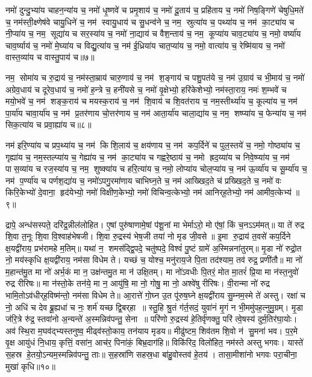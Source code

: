 नमो॑ दुन्दु॒भ्या॑य चाहन॒न्या॑य च॒ नमो॑ धृ॒ष्णवे॑ च प्रमृ॒शाय॑ च॒ नमो॑ दू॒ताय॑ च॒ प्रहि॑ताय च॒ नमो॑ निष॒ङ्गिणे॑ चेषुधि॒मते॑ च॒ नम॑स्ती॒क्ष्णेष॑वे चायु॒धिने॑ च॒ नम॑ स्वायु॒धाय॑ च सु॒धन्व॑ने च॒ नम॒ स्रुत्या॑य च॒ पथ्या॑य च॒ नम॑ का॒ट्या॑य च नी॒प्या॑य च॒ नम॒ सूद्या॑य च सर॒स्या॑य च॒ नमो॑ ना॒द्याय॑ च वैश॒न्ताय॑ च॒ नम॒ कूप्या॑य चाव॒ट्या॑य च॒ नमो॒ वर्ष्या॑य चाव॒र्ष्याय॑ च॒ नमो॑ मे॒घ्या॑य च विद्यु॒त्या॑य च॒ नम॑ ई॒ध्रिया॑य चात॒प्या॑य च॒ नमो॒ वात्या॑य च॒ रेष्मि॑याय च॒ नमो॑ वास्त॒व्या॑य च वास्तु॒पाय॑ च॥७॥ 

नम॒ सोमा॑य च रु॒द्राय॑ च॒ नम॑स्ता॒म्राय॑ चारु॒णाय॑ च॒ नम॑ श॒ङ्गाय॑ च पशु॒पत॑ये च॒ नम॑ उ॒ग्राय॑ च भी॒माय॑ च॒ नमो॑ अग्रेव॒धाय॑ च दूरेव॒धाय॑ च॒ नमो॑ ह॒न्त्रे च॒ हनी॑यसे च॒ नमो॑ वृ॒क्षेभ्यो॒ हरि॑केशेभ्यो॒ नम॑स्ता॒राय॒ नमः॑  श॒म्भवे॑ च मयो॒भवे॑ च॒ नम॑ शङ्क॒राय॑ च मयस्क॒राय॑ च॒ नम॑ शि॒वाय॑ च शि॒वत॑राय च॒ नम॒स्तीर्थ्या॑य च॒ कूल्या॑य च॒ नम॑ पा॒र्या॑य चावा॒र्या॑य च॒ नम॑ प्र॒तर॑णाय चो॒त्तर॑णाय च॒ नम॑ आता॒र्या॑य चाला॒द्या॑य च॒ नम॒ शष्प्या॑य च॒ फेन्या॑य च॒ नम॑ सिक॒त्या॑य च प्रवा॒ह्या॑य च॥८॥ 

नम॑ इरि॒ण्या॑य च प्रप॒थ्या॑य च॒ नम॑ किशि॒लाय॑ च॒ क्षय॑णाय च॒ नम॑ कप॒र्दिने॑ च पुल॒स्तये॑ च॒ नमो॒ गोष्ठ्या॑य च॒ गृह्या॑य च॒ नम॒स्तल्प्या॑य च॒ गेह्या॑य च॒ नम॑ का॒ट्या॑य च गह्वरे॒ष्ठाय॑ च॒ नमो ह्रद॒य्या॑य च निवे॒ष्प्या॑य च॒ नम॑ पास॒व्या॑य च रज॒स्या॑य च॒ नम॒ शुष्क्या॑य च हरि॒त्या॑य च॒ नमो॒ लोप्या॑य चोल॒प्या॑य च॒ नम॑ ऊ॒र्व्या॑य च सू॒र्म्या॑य च॒ नम॑ प॒र्ण्या॑य च पर्णश॒द्या॑य च॒ नमो॑ऽपगु॒रमा॑णाय चाभिघ्न॒ते च॒ नम॑ आख्खिद॒ते च॑ प्रख्खिद॒ते च॒ नमो॑ वः किरि॒केभ्यो॑ दे॒वाना॒ हृद॑येभ्यो॒ नमो॑ विक्षीण॒केभ्यो॒ नमो॑ विचिन्व॒त्केभ्यो॒ नम॑ आनिर्‌ह॒तेभ्यो॒ नम॑ आमीव॒त्केभ्य॑॥९॥ 

द्रापे॒ अन्ध॑सस्पते॒ दरि॑द्र॒न्नील॑लोहित। ए॒षां पुरु॑षाणामे॒षां प॑शू॒नां मा भेर्माऽरो॒ मो ए॑षां॒ किं च॒नऽऽम॑मत्॥ या ते॑ रुद्र शि॒वा त॒नूः शि॒वा वि॒श्वाह॑भेषजी। शि॒वा रु॒द्रस्य॑ भेष॒जी तया॑ नो मृड जी॒वसे॥ इ॒मा रु॒द्राय॑ त॒वसे॑ कप॒र्दिने क्ष॒यद्वी॑राय॒ प्रभ॑रामहे म॒तिम्॥ यथा॑ न॒ शमस॑द्द्वि॒पदे॒ चतु॑ष्पदे॒ विश्वं॑ पु॒ष्टं ग्रामे॑ अ॒स्मिन्नना॑तुरम्॥ मृ॒डा नो॑ रुद्रो॒त नो॒ मय॑स्कृधि क्ष॒यद्वी॑राय॒ नम॑सा विधेम ते। यच्छं च॒ योश्च॒ मनु॑राय॒जे पि॒ता तद॑श्याम॒ तव॑ रुद्र॒ प्रणी॑तौ॥ मा नो॑ म॒हान्त॑मु॒त मा नो॑ अर्भ॒कं मा न॒ उक्ष॑न्तमु॒त मा न॑ उक्षि॒तम्। मा नो॑ऽवधीः पि॒तरं॒ मोत मा॒तरं॑ प्रि॒या मा न॑स्त॒नुवो॑ रुद्र रीरिषः॥ मा न॑स्तो॒के तन॑ये॒ मा न॒ आयु॑षि॒ मा नो॒ गोषु॒ मा नो॒ अश्वे॑षु रीरिषः। वी॒रान्मा नो॑ रुद्र भामि॒तोऽव॑धीर्‌ह॒विष्म॑न्तो॒ नम॑सा विधेम ते॥ आ॒रात्ते॑ गो॒घ्न उ॒त पू॑रुष॒घ्ने क्ष॒यद्वी॑राय सु॒म्नम॒स्मे ते॑ अस्तु। रक्षा॑ च नो॒ अधि॑ च देव ब्रू॒ह्यधा॑ च नः॒ शर्म॑ यच्छ द्वि॒बर्‌हा॥ स्तु॒हि श्रु॒तं ग॑र्त॒सदं॒ युवा॑नं मृ॒गं न भी॒ममु॑पह॒त्नुमु॒ग्रम्। मृ॒डा ज॑रि॒त्रे रु॑द्र॒ स्तवा॑नो अ॒न्यन्ते॑ अ॒स्मन्निव॑पन्तु॒ सेना॥ परि॑णो रु॒द्रस्य॑ हे॒तिर्वृ॑णक्तु॒ परि॑ त्वे॒षस्य॑ दुर्म॒तिर॑घा॒योः। अव॑ स्थि॒रा म॒घव॑द्भ्यस्तनुष्व॒ मीढ्व॑स्तो॒काय॒ तन॑याय मृडय॥ मीढु॑ष्टम॒ शिव॑तम शि॒वो न॑ सु॒मना॑ भव। प॒र॒मे वृ॒क्ष आयु॑धं नि॒धाय॒ कृत्तिं॒ वसा॑न॒ आच॑र॒ पिना॑कं॒ बिभ्र॒दाग॑हि॥ विकि॑रिद॒ विलो॑हित॒ नम॑स्ते अस्तु भगवः। यास्ते॑ स॒हस्र हे॒तयो॒ऽन्यम॒स्मन्निव॑पन्तु॒ ताः॥ स॒हस्रा॑णि सहस्र॒धा बा॑हु॒वोस्तव॑ हे॒तय॑। तासा॒मीशा॑नो भगवः परा॒चीना॒ मुखा॑ कृधि॥१०॥ 

